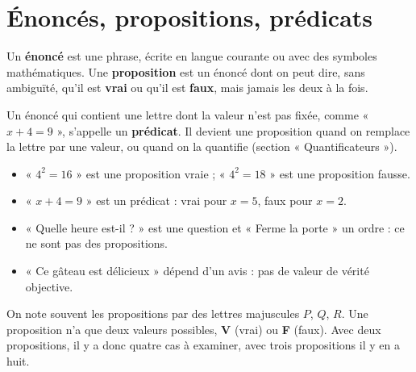 \section{Énoncés, propositions, prédicats}
\begin{definition}
Un \textbf{énoncé} est une phrase, écrite en langue courante ou avec des symboles mathématiques. Une \textbf{proposition} est un énoncé dont on peut dire, sans ambiguïté, qu'il est \textbf{vrai} ou qu'il est \textbf{faux}, mais jamais les deux à la fois.
\end{definition}
Un énoncé qui contient une lettre dont la valeur n'est pas fixée, comme « $x+4=9$ », s'appelle un \textbf{prédicat}. Il devient une proposition quand on remplace la lettre par une valeur, ou quand on la quantifie (section « Quantificateurs »).
\begin{example}
\begin{itemize}
\item « $4^2=16$ » est une proposition vraie ; « $4^2=18$ » est une proposition fausse.
\item « $x+4=9$ » est un prédicat : vrai pour $x=5$, faux pour $x=2$.
\item « Quelle heure est-il ? » est une question et « Ferme la porte » un ordre : ce ne sont pas des propositions.
\item « Ce gâteau est délicieux » dépend d'un avis : pas de valeur de vérité objective.
\end{itemize}
\end{example}
On note souvent les propositions par des lettres majuscules $P$, $Q$, $R$. Une proposition n'a que deux valeurs possibles, \textbf{V} (vrai) ou \textbf{F} (faux). Avec deux propositions, il y a donc quatre cas à examiner, avec trois propositions il y en a huit.

